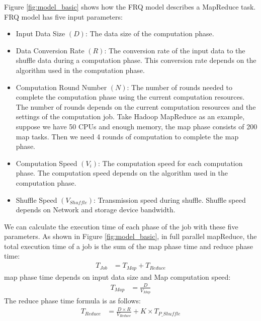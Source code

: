 {Figure \ref{fig:model_basic} shows how the FRQ model describes a MapReduce task. FRQ model has five input parameters:
\begin{itemize}
	\item Input Data Size \((D)\): The data size of the computation phase.
	\item Data Conversion Rate \((R)\): The conversion rate of the input data to the shuffle data during a computation phase. This conversion rate depends on the algorithm used in the computation phase.
    \item Computation Round Number \((N)\): The number of rounds needed to complete the computation phase using the current computation resources. The number of rounds depends on the current computation resources and the settings of the computation job. Take Hadoop MapReduce as an example, suppose we have 50 CPUs and enough memory, the map phase consists of 200 map tasks. Then we need 4 rounds of computation to complete the map phase.
    \item Computation Speed \((V_{i})\): 
    The computation speed for each computation phase. The computation speed depends on the algorithm used in the computation phase.
    \item Shuffle Speed \((V_{Shuffle})\): 
    Transmission speed during shuffle. Shuffle speed depends on Network and storage device bandwidth.
\end{itemize}

We can calculate the execution time of each phase of the job with these five parameters. As shown in Figure \ref{fig:model_basic}, in full parallel mapReduce, the total execution time of a job is the sum of the map phase time and reduce phase time:
\begin{equation}
\label{equation_Tjob}
\begin{aligned}
    T_{Job} &= T_{Map} + T_{Reduce}
\end{aligned}
\end{equation}
map phase time depends on input data size and Map computation speed:
\begin{equation}
\label{equation_Tmap}
\begin{aligned}
    T_{Map} &= {{\frac{D}{V_{Map}}}}
\end{aligned}
\end{equation}
The reduce phase time formula is as follows:
\begin{equation}
\label{equation_Treduce}
\begin{aligned}
    T_{Reduce} &= \frac{D \times R}{V_{Reduce}} + K \times T_{P\_Shuffle}
\end{aligned}
\end{equation}

}
